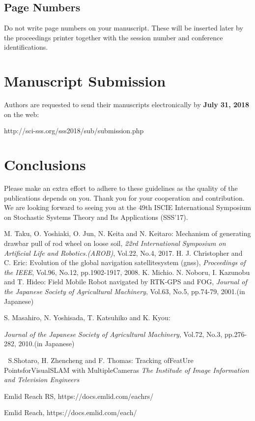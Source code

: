 \documentclass[a4paper]{article}
\begin{document}
\subsection{Page Numbers}
Do not write page numbers on your manuscript.
These will be inserted later by the proceedings printer together with
the session number and conference identifications.


\section{Manuscript Submission}
Authors are requested to send their manuscripts electronically by
{\bf July 31, 2018} on the web:
\begin{center}
http://sci-sss.org/sss2018/sub/submission.php
\end{center}


\section{Conclusions}

Please make an extra effort to adhere to these guidelines as the quality
of the publications depends on you.
Thank you for your cooperation and contribution.
We are looking forward to seeing you at the 49th ISCIE International Symposium
on Stochastic Systems Theory and Its Applications (SSS'17).


\begin{thebibliography}{99}
M. Taku, O. Yoshiaki, O. Jun, N. Keita and N. Keitaro:
Mechanism of generating drawbar pull of rod wheel on loose soil,
{\it 22rd International Symposium on Artificial Life and Robotics.(AROB)}, Vol.22, No.4, 2017.
H. J. Christopher and C. Eric:
Evolution of the global navigation satellitesystem (gnss),
{\it Proceedings of the IEEE}, Vol.96, No.12, pp.1902-1917, 2008.
K. Michio. N. Noboru, I. Kazunobu and T. Hideo: 
Field Mobile Robot navigated by RTK-GPS and FOG, 
{\it Journal of the Japanese Society of Agricultural Machinery}, Vol.63, No.5, pp.74-79, 2001.(in Japanese)

S. Masahiro, N. Yoshisada, T. Katsuhiko and K. Kyou: 

{\it Journal of the Japanese Society of Agricultural Machinery}, Vol.72, No.3, pp.276-282, 2010.(in Japanese)


S.Shotaro, H. Zhencheng and F. Thomas:
Tracking ofFeatUre PointsforVisualSLAM with MultipleCameras
{\it The Institude of Image Information and Television Engineers}

Emlid Reach RS, https://docs.emlid.com/eachrs/

Emlid Reach, https://docs.emlid.com/each/

\end{thebibliography}
\end{document}
